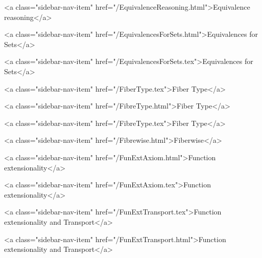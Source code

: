       
        
          <a class="sidebar-nav-item" href="/EquivalenceReasoning.html">Equivalence reasoning</a>
        
      
    
      
        
          <a class="sidebar-nav-item" href="/EquivalencesForSets.html">Equivalences for Sets</a>
        
      
    
      
        
          <a class="sidebar-nav-item" href="/EquivalencesForSets.tex">Equivalences for Sets</a>
        
      
    
      
        
          <a class="sidebar-nav-item" href="/FiberType.tex">Fiber Type</a>
        
      
    
      
        
          <a class="sidebar-nav-item" href="/FibreType.html">Fiber Type</a>
        
      
    
      
        
          <a class="sidebar-nav-item" href="/FibreType.tex">Fiber Type</a>
        
      
    
      
        
          <a class="sidebar-nav-item" href="/Fibrewise.html">Fiberwise</a>
        
      
    
      
        
          <a class="sidebar-nav-item" href="/FunExtAxiom.html">Function extensionality</a>
        
      
    
      
        
          <a class="sidebar-nav-item" href="/FunExtAxiom.tex">Function extensionality</a>
        
      
    
      
        
          <a class="sidebar-nav-item" href="/FunExtTransport.tex">Function extensionality and Transport</a>
        
      
    
      
        
          <a class="sidebar-nav-item" href="/FunExtTransport.html">Function extensionality and Transport</a>
        

